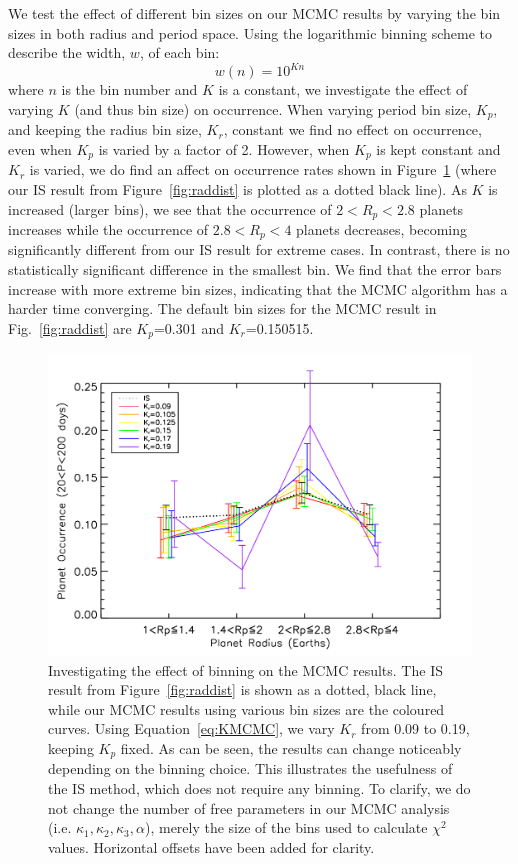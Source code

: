 We test the effect of 
different bin sizes on our MCMC results 
by varying the bin sizes in both radius and period space. Using the
logarithmic binning scheme to describe the width, $w$, of each bin:
\begin{equation}
w(n) = 10^{Kn}
\label{eq:KMCMC}
\end{equation}
where $n$ is the bin number and $K$ is a constant, we 
investigate the effect of varying $K$ (and thus bin size) on occurrence.  
When varying period bin size, $K_p$, and keeping the radius bin size, $K_r$, 
constant we find no effect on occurrence, even when $K_p$ is varied by a factor 
of 2. However, when $K_p$ is kept constant and $K_r$ is varied, we do find an affect on  
occurrence rates shown in Figure~\ref{fig:bintest} (where our IS result from 
Figure~\ref{fig:raddist} is plotted as a dotted black line). 
As $K$ is increased (larger bins), we see that the occurrence of $2<R_p<2.8$\rearth{} planets 
increases while the occurrence of $2.8<R_p<4$\rearth{} planets decreases, becoming 
significantly different from our IS result for extreme cases. In contrast, there is no statistically 
significant difference in the smallest bin. We find that 
the error bars increase with more extreme bin sizes, indicating that the MCMC algorithm
has a harder time converging. The default bin sizes for the MCMC result in
Fig.~\ref{fig:raddist} are $K_p$=0.301 and $K_r$=0.150515.

\begin{figure}
\centerline{\includegraphics[scale=0.55]{chap2/Silburt_mcmcbin_decRp3.pdf}}
\caption{Investigating the effect of binning on the MCMC results. The IS result from Figure~\ref{fig:raddist} is shown as a dotted, black line, 
while our MCMC results using various bin sizes are the coloured curves. Using
Equation~\ref{eq:KMCMC}, we vary $K_r$ from 0.09 to 0.19, keeping $K_p$ fixed. 
As can be seen, the results can change noticeably depending on
the binning choice. This illustrates the usefulness of the IS method, which does not 
require any binning. To clarify, we do not change the number of free parameters in our
MCMC analysis (i.e. $\kappa_1, \kappa_2, \kappa_3, \alpha$), merely the size of the
bins used to calculate $\chi^2$ values. Horizontal offsets have been added for clarity.}
\label{fig:bintest}
\end{figure}

